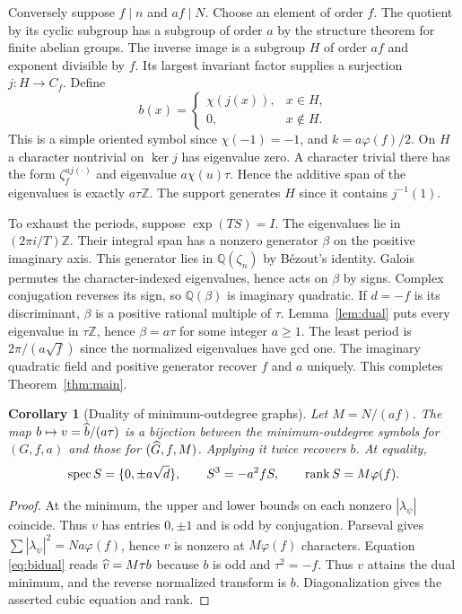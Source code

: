 \documentclass[11pt]{article}
\newtheorem{corollary}[theorem]{Corollary}
\newcommand{\Z}{\mathbb Z}\newcommand{\Q}{\mathbb Q}\newcommand{\C}{\mathbb C}
\begin{document}
Conversely suppose $f\mid n$ and $af\mid N$. Choose an element of order $f$. The quotient by its cyclic subgroup has a subgroup of order $a$ by the structure theorem for finite abelian groups. The inverse image is a subgroup $H$ of order $af$ and exponent divisible by $f$. Its largest invariant factor supplies a surjection $j:H\to C_f$. Define
\begin{equation}
 b(x)=\begin{cases}\chi(j(x)),&x\in H,\\0,&x\notin H.\end{cases}
 \label{eq:construct}
\end{equation}
This is a simple oriented symbol since $\chi(-1)=-1$, and $k=a\varphi(f)/2$. On $H$ a character nontrivial on $\ker j$ has eigenvalue zero. A character trivial there has the form $\zeta_f^{u j(\cdot)}$ and eigenvalue $a\chi(u)\tau$. Hence the additive span of the eigenvalues is exactly $a\tau\Z$. The support generates $H$ since it contains $j^{-1}(1)$.

To exhaust the periods, suppose $\exp(TS)=I$. The eigenvalues lie in $(2\pi i/T)\Z$. Their integral span has a nonzero generator $\beta$ on the positive imaginary axis. This generator lies in $\Q(\zeta_n)$ by B\'ezout's identity. Galois permutes the character-indexed eigenvalues, hence acts on $\beta$ by signs. Complex conjugation reverses its sign, so $\Q(\beta)$ is imaginary quadratic. If $d=-f$ is its discriminant, $\beta$ is a positive rational multiple of $\tau$. Lemma~\ref{lem:dual} puts every eigenvalue in $\tau\Z$, hence $\beta=a\tau$ for some integer $a\ge1$. The least period is $2\pi/(a\sqrt f)$ since the normalized eigenvalues have gcd one. The imaginary quadratic field and positive generator recover $f$ and $a$ uniquely. This completes Theorem~\ref{thm:main}.

\begin{corollary}[Duality of minimum-outdegree graphs]\label{cor:rank}
Let $M=N/(af)$. The map $b\mapsto v=\widehat b/(a\tau)$ is a bijection between the minimum-outdegree symbols for $(G,f,a)$ and those for $(\widehat G,f,M)$. Applying it twice recovers $b$. At equality,
\[
       \operatorname{spec} S=\{0,\pm a\sqrt d\},\qquad
       S^3=-a^2fS,\qquad \operatorname{rank} S=M\varphi(f).
\]
\end{corollary}
\begin{proof}
At the minimum, the upper and lower bounds on each nonzero $|\lambda_\psi|$ coincide. Thus $v$ has entries $0,\pm1$ and is odd by conjugation. Parseval gives $\sum|\lambda_\psi|^2=Na\varphi(f)$, hence $v$ is nonzero at $M\varphi(f)$ characters. Equation \eqref{eq:bidual} reads $\widehat v=M\tau b$ because $b$ is odd and $\tau^2=-f$. Thus $v$ attains the dual minimum, and the reverse normalized transform is $b$. Diagonalization gives the asserted cubic equation and rank.
\end{proof}
\end{document}
